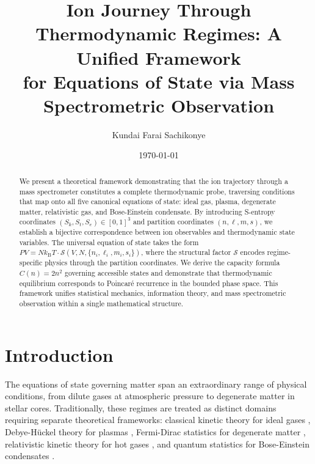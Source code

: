 \documentclass[twocolumn,aps,prd,superscriptaddress,nofootinbib]{revtex4-2}
\newcommand{\Sk}{S_k}
\newcommand{\St}{S_t}
\newcommand{\Se}{S_e}
\newcommand{\kB}{k_{\mathrm{B}}}
\begin{document}
\title{Ion Journey Through Thermodynamic Regimes: A Unified Framework\\
for Equations of State via Mass Spectrometric Observation}

\author{Kundai Farai Sachikonye }

\date{\today}

\begin{abstract}
We present a theoretical framework demonstrating that the ion trajectory through a mass spectrometer constitutes a complete thermodynamic probe, traversing conditions that map onto all five canonical equations of state: ideal gas, plasma, degenerate matter, relativistic gas, and Bose-Einstein condensate. By introducing S-entropy coordinates $(\Sk, \St, \Se) \in [0,1]^3$ and partition coordinates $(n, \ell, m, s)$, we establish a bijective correspondence between ion observables and thermodynamic state variables. The universal equation of state takes the form $PV = N\kB T \cdot \mathcal{S}(V, N, \{n_i, \ell_i, m_i, s_i\})$, where the structural factor $\mathcal{S}$ encodes regime-specific physics through the partition coordinates. We derive the capacity formula $C(n) = 2n^2$ governing accessible states and demonstrate that thermodynamic equilibrium corresponds to Poincar\'{e} recurrence in the bounded phase space. This framework unifies statistical mechanics, information theory, and mass spectrometric observation within a single mathematical structure.
\end{abstract}

\maketitle

\section{Introduction}

The equations of state governing matter span an extraordinary range of physical conditions, from dilute gases at atmospheric pressure to degenerate matter in stellar cores. Traditionally, these regimes are treated as distinct domains requiring separate theoretical frameworks: classical kinetic theory for ideal gases \cite{boltzmann1964lectures}, Debye-H\"{u}ckel theory for plasmas \cite{debye1923theory}, Fermi-Dirac statistics for degenerate matter \cite{fermi1926quantisierung}, relativistic kinetic theory for hot gases \cite{juttner1911maxwell}, and quantum statistics for Bose-Einstein condensates \cite{einstein1924quantentheorie, bose1924plancks}.
\end{document}
